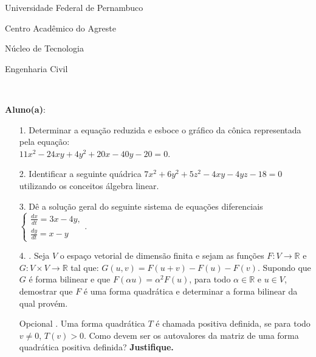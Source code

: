 \documentclass[oneside,a4paper,12pt]{article}
\newcommand{\universidade}{Universidade Federal de Pernambuco}
\newcommand{\centro}{Centro Acadêmico do Agreste}
\newcommand{\departamento}{Núcleo de Tecnologia}
\newcommand{\curso}{Engenharia Civil}
\begin{document}
	\pagestyle{empty}
	
	\begin{center}
	 	\vspace{0pt}
	 	
		\universidade
		\par
		\centro
		\par
		\departamento
		\par
		\curso
		\par
		\vspace{08pt}
		\\
	\end{center}
	
	
	\begin{flushleft}
		\textbf{Aluno(a)}:
	\end{flushleft}
	
\begin{itemize}
\item[1.] Determinar a equação reduzida e esboce o gráfico da cônica representada pela equação: \\$11x^{2}-24xy+4y^{2}+20x-40y-20=0$.
\end{itemize}
\begin{itemize}
\item[2.] Identificar a seguinte quádrica $7x^{2}+6y^{2}+5z^{2}-4xy-4yz-18=0$ utilizando os conceitos álgebra linear.
 \end{itemize}
 \begin{itemize}
\item [3.] Dê a solução geral do seguinte sistema de equações diferenciais
$\begin{cases}
\frac{dx}{dt}=3x-4y,\\
\frac{dy}{dt}=x-y
\end{cases}$.
\end{itemize}
\begin{itemize}
\item[4.]. Seja $V$ o espaço vetorial de dimensão finita e sejam as funções $F:V\longrightarrow \mathbb{R}$ e $G: V \times V \longrightarrow \mathbb{R}$ tal que: $G(u,v)=F(u+v)-F(u)-F(v)$. Supondo que $G$ é forma bilinear e que $F(\alpha u)=\alpha^{2}F(u)$, para todo $\alpha\in \mathbb{R}$ e $u\in V$, demostrar que $F$ é uma forma quadrática e determinar a forma bilinear da qual provém.
\end{itemize}
\begin{itemize}
	\item[Opcional]. Uma forma quadrática $T$ é chamada positiva definida, se para todo $v\neq 0$, $T(v)>0$. Como devem ser os autovalores da matriz de uma forma quadrática positiva definida? \textbf{Justifique.}
	
\end{itemize}
	\flushbottom
	\flushright
    
\end{document}
